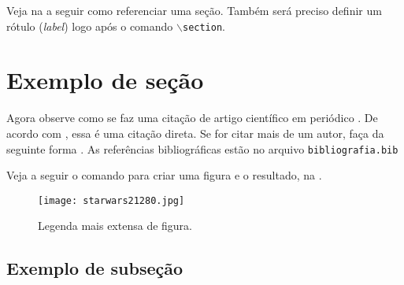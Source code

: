 Veja na  a seguir como referenciar uma seção. Também será preciso definir um rótulo (\textit{label}) logo após o comando \texttt{$\backslash$section}.

\section{Exemplo de seção}\label{sec:exemplo_secao} 
Agora observe como se faz uma citação de artigo científico em periódico \cite{Gradvohl2014c}. De acordo com , essa é uma citação direta. Se for citar mais de um autor, faça da seguinte forma \cite{ZAMBON2015, Gradvohl2015}. As referências bibliográficas estão no arquivo \texttt{bibliografia.bib}

Veja a seguir o comando para criar uma figura e o resultado, na .

\begin{figure}[!htb]
\centering
\texttt{[image: starwars21280.jpg]}
\caption[Legenda curta de figura]{Legenda mais extensa de figura.}
\label{fig:xwing}
\end{figure}

\subsection{Exemplo de subseção}
\lipsum[5]
